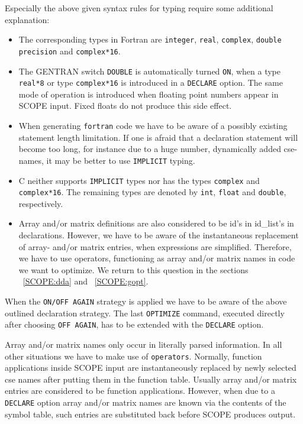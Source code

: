 Especially the above given syntax rules for typing require some additional
explanation:
\begin{itemize}
\item The corresponding types in Fortran are {\tt integer}, {\tt real},
{\tt complex}, {\tt double precision} and {\tt complex*16}.
\item The GENTRAN switch {\tt DOUBLE} is automatically turned {\tt ON},
when a type {\tt real*8} or  type {\tt complex*16}  is introduced in
a {\tt DECLARE} option. The same mode of operation is introduced when
floating point numbers appear in SCOPE input. Fixed floats do not produce
this side effect.
\item When generating {\tt fortran} code we have to be aware of a possibly
existing statement length limitation. If one is afraid that a declaration statement
will become
too long, for instance due to a huge number, dynamically added cse-names,
it may be better to use {\tt IMPLICIT} typing.
\item C neither supports {\tt IMPLICIT} types nor has the
types {\tt complex} and {\tt complex*16}. The remaining types are denoted
by {\tt int}, {\tt float} and {\tt double}, respectively.
\item Array and/or matrix definitions are also considered to be id's in
 id\_list's in declarations.
However, we have to be aware of the instantaneous replacement of array-
and/or matrix entries, when  expressions are simplified. Therefore, we have to
use operators, functioning as array and/or matrix names in code we want to
optimize. We return to this question in the sections ~\ref{SCOPE:dda} and
 ~\ref{SCOPE:gopt}.
\end{itemize}
When the {\tt ON/OFF AGAIN} strategy is applied we have to be aware of the
above outlined declaration strategy. The last {\tt OPTIMIZE} command,
executed directly after choosing {\tt OFF AGAIN}, has to be extended
with the {\tt DECLARE} option.

Array and/or matrix names only occur in literally parsed information. In all
other situations we have to make use of {\REDUCE} {\tt operators}. Normally,
function applications inside SCOPE input are instantaneously replaced by
newly selected cse names after putting them in the function table.
Usually array and/or matrix entries are considered to be function applications.
However, when due to a {\tt DECLARE} option array and/or matrix names
are known via the contents of the symbol table, such entries are
substituted back before SCOPE produces output.

